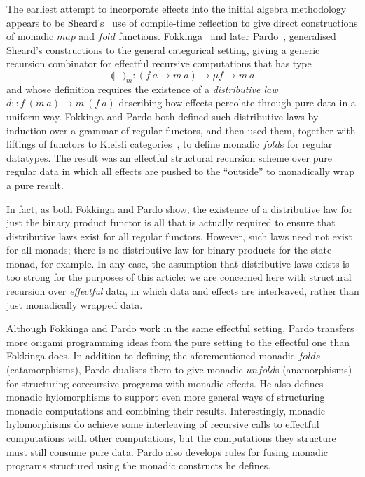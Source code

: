\documentclass{jfp1}
\newcommand{\fold}[1]{\llparenthesis #1 \rrparenthesis}
\begin{document}
The earliest attempt to incorporate effects into the initial algebra
methodology appears to be Sheard's~\cite{she93a,she93b} use of
compile-time reflection to give direct constructions of monadic
$\mathit{map}$ and $\mathit{fold}$ functions.
Fokkinga~\cite{fokkinga94monadic} and later
Pardo~\cite{pardo04combining}, generalised Sheard's constructions to
the general categorical setting, giving a generic recursion combinator
for effectful recursive computations that has type
\begin{displaymath}
  \fold{-}_m : (f~a \to m~a) \to \mu f \to m~a
\end{displaymath}
and whose definition requires the existence of a \emph{distributive
  law} $d :: f~(m~a) \to m~(f~a)$ describing how effects percolate
through pure data in a uniform way.  Fokkinga and Pardo both defined
such distributive laws by induction over a grammar of regular
functors, and then used them, together with liftings of functors to
Kleisli categories~\cite{bw90,mul93}, to define monadic
$\mathit{fold}$s for regular datatypes. The result was an effectful
structural recursion scheme over pure regular data in which all
effects are pushed to the ``outside'' to monadically wrap a pure
result.

In fact, as both Fokkinga and Pardo show, the existence of a
distributive law for just the binary product functor is all that is
actually required to ensure that distributive laws exist for all
regular functors. However, such laws need not exist for all monads;
there is no distributive law for binary products for the state monad,
for example. In any case, the assumption that distributive laws exists
is too strong for the purposes of this article: we are concerned here
with structural recursion over \emph{effectful} data, in which data
and effects are interleaved, rather than just monadically wrapped
data.

Although Fokkinga and Pardo work in the same effectful setting, Pardo
transfers more origami programming ideas from the pure setting to the
effectful one than Fokkinga does. In addition to defining the
aforementioned monadic $\mathit{fold}s$ (catamorphisms), Pardo
dualises them to give monadic $\mathit{unfold}$s (anamorphisms) for
structuring corecursive programs with monadic effects. He also defines
monadic hylomorphisms to support even more general ways of structuring
monadic computations and combining their results. Interestingly,
monadic hylomorphisms do achieve some interleaving of recursive calls
to effectful computations with other computations, but the
computations they structure must still consume pure data.  Pardo also
develops rules for fusing monadic programs structured using the
monadic constructs he defines.
\end{document}

